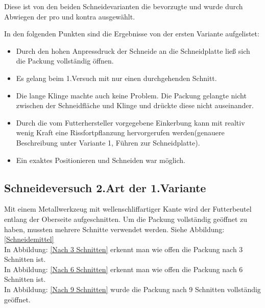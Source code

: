 Diese ist von den beiden Schneidevarianten die bevorzugte und wurde durch  Abwiegen der pro und kontra ausgewählt.

In den folgenden Punkten sind die Ergebnisse von der ersten Variante aufgelistet:

\begin{itemize}
\item Durch den hohen Anpressdruck der Schneide an die Schneidplatte ließ sich die Packung vollständig öffnen.
\item Es gelang beim 1.Versuch mit nur einen durchgehenden Schnitt.
\item Die lange Klinge machte auch keine Problem. Die Packung gelangte nicht zwischen der Schneidfläche und Klinge und drückte diese nicht auseinander.
\item Durch die vom Futterhersteller vorgegebene Einkerbung kann mit realtiv wenig Kraft eine Rissfortpflanzung hervorgerufen werden(genauere Beschreibung unter Variante 1, Führen zur Schneidplatte).
\item Ein exaktes Positionieren und Schneiden war möglich.
\end{itemize} 

\subsection{Schneideversuch 2.Art der 1.Variante}
\label{Schneideversuch_2}
Mit einem Metallwerkzeug mit wellenschliffartiger Kante wird der Futterbeutel entlang der Oberseite aufgeschnitten. Um die Packung vollständig geöffnet zu haben, mussten mehrere Schnitte verwendet werden. Siehe Abbildung: \ref{Schneidemittel}\\
In Abbildung: \ref{Nach 3 Schnitten} erkennt man wie offen die Packung nach 3 Schnitten ist.\\
In Abbildung: \ref{Nach 6 Schnitten} erkennt man wie offen die Packung nach 6 Schnitten ist.\\
In Abbildung: \ref{Nach 9 Schnitten} wurde die Packung nach 9 Schnitten vollständig geöffnet.

